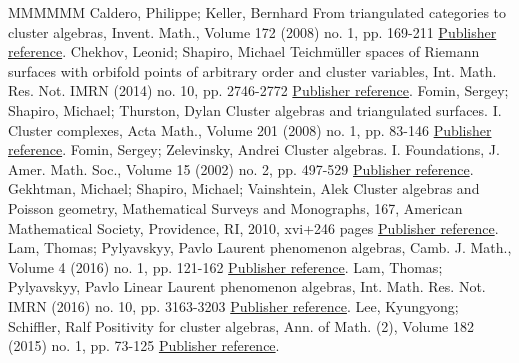 \begin{thebibliography}{MMMMMM}
 Caldero, Philippe; Keller, Bernhard From triangulated categories to cluster algebras, Invent. Math., Volume 172 (2008) no. 1, pp. 169-211 \href{https://alco.centre-mersenne.org/articles/10.5802/alco.433/#basis}{Publisher reference}.
 Chekhov, Leonid; Shapiro, Michael Teichmüller spaces of Riemann surfaces with orbifold points of arbitrary order and cluster variables, Int. Math. Res. Not. IMRN (2014) no. 10, pp. 2746-2772 \href{https://alco.centre-mersenne.org/articles/10.5802/alco.433/#cluster-teich}{Publisher reference}.
 Fomin, Sergey; Shapiro, Michael; Thurston, Dylan Cluster algebras and triangulated surfaces. I. Cluster complexes, Acta Math., Volume 201 (2008) no. 1, pp. 83-146 \href{https://alco.centre-mersenne.org/articles/10.5802/alco.433/#cluster-triangulated-surface}{Publisher reference}.
 Fomin, Sergey; Zelevinsky, Andrei Cluster algebras. I. Foundations, J. Amer. Math. Soc., Volume 15 (2002) no. 2, pp. 497-529 \href{https://alco.centre-mersenne.org/articles/10.5802/alco.433/#clusteralgebrasi}{Publisher reference}.
 Gekhtman, Michael; Shapiro, Michael; Vainshtein, Alek Cluster algebras and Poisson geometry, Mathematical Surveys and Monographs, 167, American Mathematical Society, Providence, RI, 2010, xvi+246 pages \href{https://alco.centre-mersenne.org/articles/10.5802/alco.433/#cluster-poisson}{Publisher reference}.
 Lam, Thomas; Pylyavskyy, Pavlo Laurent phenomenon algebras, Camb. J. Math., Volume 4 (2016) no. 1, pp. 121-162 \href{https://alco.centre-mersenne.org/articles/10.5802/alco.433/#LP}{Publisher reference}.
 Lam, Thomas; Pylyavskyy, Pavlo Linear Laurent phenomenon algebras, Int. Math. Res. Not. IMRN (2016) no. 10, pp. 3163-3203 \href{https://alco.centre-mersenne.org/articles/10.5802/alco.433/#linearLP}{Publisher reference}.
 Lee, Kyungyong; Schiffler, Ralf Positivity for cluster algebras, Ann. of Math. (2), Volume 182 (2015) no. 1, pp. 73-125 \href{https://alco.centre-mersenne.org/articles/10.5802/alco.433/#cluster-positivity-LS}{Publisher reference}.
\end{thebibliography}
